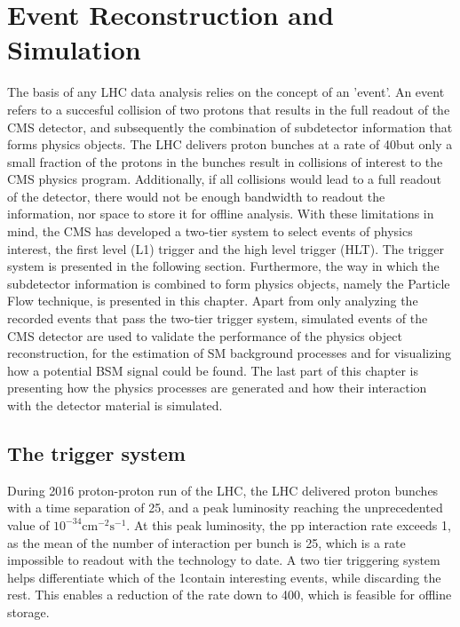\chapter{Event Reconstruction and Simulation}
\noindent
\justify
The basis of any LHC data analysis relies on the concept of an 'event'. 
An event refers to a succesful collision of two protons that results in the full readout of the CMS detector, and subsequently the combination of subdetector information that forms physics objects. 
The LHC delivers proton bunches at a rate of 40\MHz but only a small fraction of the protons in the bunches result in collisions of interest to the CMS physics program.
Additionally, if all collisions would lead to a full readout of the detector, there would not be enough bandwidth to readout the information, nor space to store it for offline analysis. 
With these limitations in mind, the CMS has developed a two-tier system to select events of physics interest, the first level (L1) trigger and the high level trigger (HLT). 
The trigger system is presented in the following section. 
Furthermore, the way in which the subdetector information is combined to form physics objects, namely the Particle Flow technique, is presented in this chapter. 
Apart from only analyzing the recorded events that pass the two-tier trigger system, simulated events of the CMS detector are used to validate the performance of the physics object reconstruction, for the estimation of SM background processes and for visualizing how a potential BSM signal could be found. 
The last part of this chapter is presenting how the physics processes are generated and how their interaction with the detector material is simulated. 
\newpage
\section{The trigger system}\label{trigger}
\noindent
\justify
During 2016 proton-proton run of the LHC, the LHC delivered proton bunches with a time separation of 25\ns, and a peak luminosity reaching the unprecedented value of $10^{-34}\mathrm{cm}^{-2}\mathrm{s}^{-1}$. 
At this peak luminosity, the pp interaction rate exceeds 1\GHz, as the mean of the number of interaction per bunch is 25, which is a rate impossible to readout with the technology to date.   
A two tier triggering system helps differentiate which of the 1\GHz contain interesting events, while discarding the rest. 
This enables a reduction of the rate down to 400\Hz, which is feasible for offline storage.   
